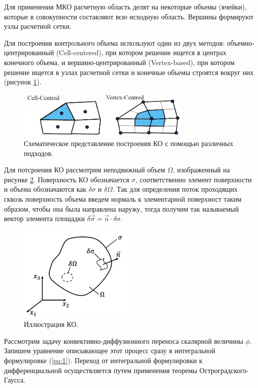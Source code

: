 Для применения МКО расчетную область делят на некоторые объемы (ячейки), которые в совокупности составляют всю исходную область. Вершины формируют узлы расчетной сетки.

Для построения контрольного объема используют один из двух методов: объемно-центрированный (Cell-centered), при котором решение ищется в центрах конечного объема, и вершино-центрированный (Vertex-based), при котором решение ищется в узлах расчетной сетки и конечные объемы строятся вокруг них (рисунок \ref{fig:1}).

\begin{figure}[H]
    \centering
    \includegraphics[width=0.75\textwidth]{img/1.png}
    \caption{Схематическое представление построения КО с помощью различных подходов.}
    \label{fig:1}
\end{figure}

Для потсроения КО рассмотрим неподвижный объем $\Omega$, изображенный на рисунке \ref{fig:2}. Поверхность КО обозначается $\sigma$, соответственно элемент поверхности и объема обозначаются как $\delta\sigma$ и $\delta\Omega$. Так для определения поток проходящих сквозь поверхность объема введем нормаль к элементарной поверхност таким образом, чтобы она была направлена наружу, тогда получим так называемый вектор элемента площадки $\delta\vec{\sigma}=\vec{n}\cdot\delta\sigma$.

\begin{figure}[H]
    \centering
    \includegraphics[width=0.5\textwidth]{img/2.png}
    \caption{Иллюстрация КО.}
    \label{fig:2}
\end{figure}

Рассмотрим задачу конвективно-диффузионного переноса скалярной величины $\phi$. Запишем уравнение описывающее этот процесс сразу в интегральной формулировке (\ref{eq:1}). Переход от интегральной формулировки к дифференциальной осуществляется путем применения теоремы Остроградского-Гаусса.

